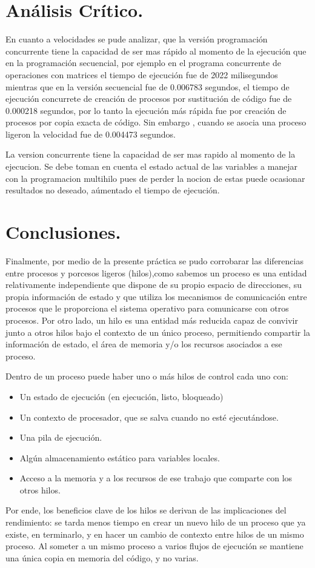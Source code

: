 \documentclass[12pt]{article}
\begin{document}
\section{Análisis Crítico.}
En cuanto a velocidades  se pude analizar, que la versión programación concurrente tiene la capacidad de ser mas rápido al momento de la ejecución que en la programación secuencial, por ejemplo en el programa concurrente de operaciones con matrices el tiempo de ejecución fue de 2022 milisegundos mientras que en la versión secuencial fue de 0.006783 segundos, el tiempo de ejecución concurrete de creación de procesos por sustitución de código fue de 0.000218 segundos, por lo tanto la ejecución más rápida fue por creación de procesos por copia exacta de código. Sin embargo , cuando se asocia una proceso ligeron la velocidad fue de  0.004473 segundos. 

La version concurrente tiene la capacidad de ser mas rapido al momento de la ejecucion. Se debe toman en cuenta el estado actual de las variables a manejar con la programacion multihilo pues de perder la nocion de estas puede ocasionar resultados no deseado, aúmentado el tiempo de ejecución.


\newpage
\section{Conclusiones.}

Finalmente, por medio de la presente práctica se pudo corrobarar las diferencias entre procesos y porcesos ligeros (hilos),como sabemos un proceso es una entidad relativamente independiente que dispone de su propio espacio de direcciones, su propia información de estado y que utiliza los mecanismos de comunicación entre procesos que le proporciona el sistema operativo para comunicarse con otros procesos. Por otro lado, un hilo es una entidad más reducida capaz de convivir junto a otros hilos bajo el contexto de un único proceso, permitiendo compartir la información de estado, el área de memoria y/o los recursos asociados a ese proceso.


Dentro de un proceso puede haber uno o más hilos de control cada uno con:

\begin{itemize}
       \item Un estado de ejecución (en ejecución, listo, bloqueado)
        \item Un contexto de procesador, que se salva cuando no esté ejecutándose.
        \item Una pila de ejecución.
        \item Algún almacenamiento estático para variables locales.
        \item Acceso a la memoria y a los recursos de ese trabajo que comparte con los otros hilos.
   \end{itemize}
Por ende, los beneficios clave de los hilos se derivan de las implicaciones del rendimiento: se tarda menos tiempo en crear un nuevo hilo de un proceso que ya existe, en terminarlo, y en hacer un cambio de contexto entre hilos de un mismo proceso. Al someter a un mismo proceso a varios flujos de ejecución se mantiene una única copia en memoria del código, y no varias.
\end{document}
